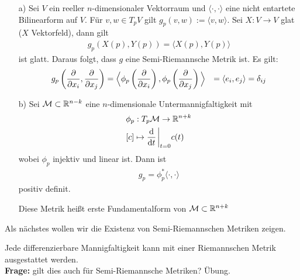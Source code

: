 \begin{bsp}
\begin{itemize}
\item[a)] Sei $V$ ein reeller $n$-dimensionaler Vektorraum und $\langle\cdot,\cdot\rangle$ eine nicht entartete Bilinearform auf $V$.
Für $v, w \in T_p V$ gilt $g_p (v, w) := \langle v, w \rangle$.
Sei $X: V \to V$ glat ($X$ Vektorfeld), dann gilt
\begin{align}
g_p (X(p), Y(p)) = \langle X(p), Y(p) \rangle
\end{align}
ist glatt.
Daraus folgt, dass $g$ eine Semi-Riemannsche Metrik ist.
Es gilt:
\begin{align*}
g_p \left( \pdv{x_i} , \pdv{x_j} \right) &= \Big{\langle} \phi_p \left(\pdv{x_i}\right) , \phi_p \left( \pdv{x_j} \right) \Big\rangle
&= \langle e_i, e_j \rangle = \delta_{ij}
\end{align*}
\item[b)] Sei $\mathcal{M} \subset \mathbb{R}^{n-k}$ eine $n$-dimensionale Untermannigfaltigkeit mit
\begin{align*}
&\phi_p: T_p\mfk \to \R^{n+k}\\
& [c] \mapsto \dv{t} \eval_{t=0} c(t)
\end{align*}
wobei $\phi_p$ injektiv und linear ist.
Dann ist 
\begin{align*}
g_p = \phi^\ast_p \langle \cdot , \cdot \rangle 
\end{align*}
positiv definit.
\begin{defs}
Diese Metrik heißt erste Fundamentalform von $\mathcal{M} \subset \mathbb{R}^{n+k}$
\end{defs}
\end{itemize}
\end{bsp}

Als nächstes wollen wir die Existenz von Semi-Riemannschen Metriken zeigen.
\begin{satz}
\label{satz:existenz_metrik}
Jede differenzierbare Mannigfaltigkeit kann mit einer Riemannschen Metrik ausgestattet werden.\\
\textbf{Frage:} gilt dies auch für Semi-Riemannsche Metriken? Übung.
\end{satz}

